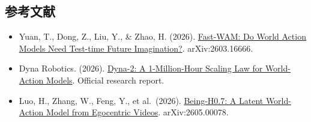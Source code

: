 \FloatBarrier
{}
\hypertarget{ux53c2ux8003ux6587ux732e-160}{%
\subsection{参考文献}\label{ux53c2ux8003ux6587ux732e-160}}

\vspace{0.25em}
\begin{itemize}
\tightlist
\item
  Yuan, T., Dong, Z., Liu, Y., \& Zhao, H. (2026). \href{https://arxiv.org/abs/2603.16666}{Fast-WAM: Do World Action Models Need Test-time Future Imagination?}. arXiv:2603.16666.
\item
  Dyna Robotics. (2026). \href{https://www.dyna.co/dyna-2}{Dyna-2: A 1-Million-Hour Scaling Law for World-Action Models}. Official research report.
\item
  Luo, H., Zhang, W., Feng, Y., et al.~(2026). \href{https://arxiv.org/abs/2605.00078}{Being-H0.7: A Latent World-Action Model from Egocentric Videos}. arXiv:2605.00078.
\end{itemize}

\clearpage
